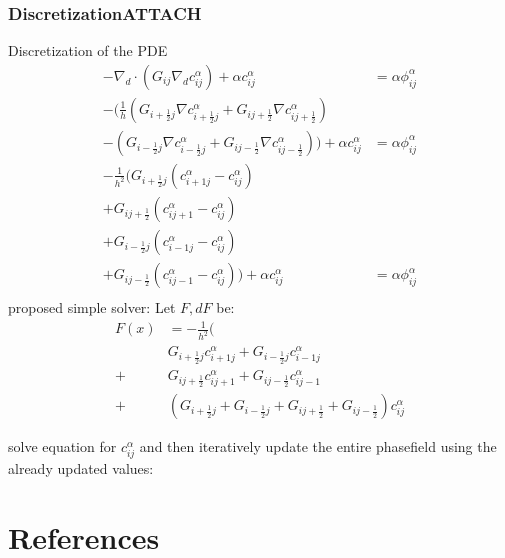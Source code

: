 \documentclass[11pt]{article}
\begin{document}
\subsubsection{Discretization\hfill{}\textsc{ATTACH}}
\label{sec:org4cbc6d7}
Discretization of the PDE
\begin{align*}
- \nabla_d \cdot  (G_{ij} \nabla_d c_{ij}^\alpha) + \alpha  c_{ij}^\alpha &= \alpha \phi_{ij}^\alpha \\
- (\frac{1}{h}(G_{i+\frac{1}{2}j} \nabla c^\alpha_{i+\frac{1}{2}j} + G_{ij+\frac{1}{2}} \nabla c^\alpha_{ij+\frac{1}{2}}) &  \\
- (G_{i-\frac{1}{2}j} \nabla c^\alpha_{i-\frac{1}{2}j} + G_{ij-\frac{1}{2}} \nabla c^\alpha_{ij-\frac{1}{2}})) + \alpha  c_{ij}^\alpha   &= \alpha  \phi_{ij}^\alpha \\
-\frac{1}{h^2} ( G_{i+\frac{1}{2}j}(c_{i+1j}^\alpha - c_{ij}^\alpha) & \\
+G_{ij+\frac{1}{2}}(c_{ij+1}^\alpha - c_{ij}^\alpha) &\\
+G_{i-\frac{1}{2}j}(c_{i-1j}^\alpha - c_{ij}^\alpha)&\\
+G_{ij-\frac{1}{2}}(c_{ij-1}^\alpha - c_{ij}^\alpha)) + \alpha  c_{ij}^\alpha &=\alpha  \phi_{ij}^\alpha \\
\end{align*}
proposed simple solver:
Let \(F, dF\) be:
\begin{align*}
F(x) &= - \frac{1}{h^2}(\\
 & G_{i+\frac{1}{2}j} c_{i+1j}^\alpha  +G_{i-\frac{1}{2}j} c_{i-1j}^\alpha \\
 +&G_{ij+\frac{1}{2}} c_{ij+1}^\alpha  + G_{ij-\frac{1}{2}}c_{ij-1}^\alpha \\
+& (G_{i+\frac{1}{2}j} +G_{i-\frac{1}{2}j}+ G_{ij+\frac{1}{2}}+  G_{ij-\frac{1}{2}}) c_{ij}^\alpha
\end{align*}

solve equation for \(c_{ij}^\alpha\) and then iteratively update the entire phasefield using the already updated values:
\section{References}
\label{sec:org577e776}
\printbibliography
\end{document}
